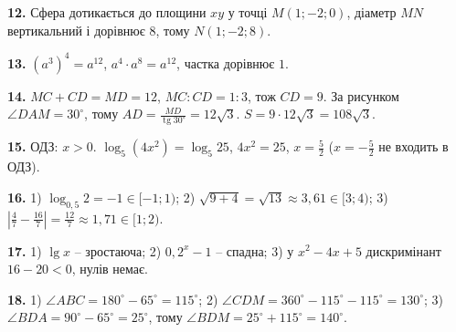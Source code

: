 \documentclass[12pt]{article}
\begin{document}
\par\noindent\textbf{12.} Сфера дотикається до площини $xy$ у точці $M(1;-2;0)$, діаметр $MN$ вертикальний і дорівнює $8$, тому $N(1;-2;8)$.\par\nopagebreak

\par\noindent\textbf{13.} $(a^3)^4=a^{12}$, $a^4\cdot a^8=a^{12}$, частка дорівнює $1$.\par\nopagebreak

\par\noindent\textbf{14.} $MC+CD=MD=12$, $MC:CD=1:3$, тож $CD=9$. За рисунком $\angle DAM=30^\circ$, тому $AD=\frac{MD}{\operatorname{tg}30^\circ}=12\sqrt3$. $S=9\cdot12\sqrt3=108\sqrt3$.\par\nopagebreak

\par\noindent\textbf{15.} ОДЗ: $x>0$. $\log_5(4x^2)=\log_5 25$, $4x^2=25$, $x=\frac52$ ($x=-\frac52$ не входить в ОДЗ).\par\nopagebreak

\par\noindent\textbf{16.} 1) $\log_{0{,}5}2=-1\in[-1;1)$; 2) $\sqrt{9+4}=\sqrt{13}\approx3{,}61\in[3;4)$; 3) $\left|\frac47-\frac{16}{7}\right|=\frac{12}{7}\approx1{,}71\in[1;2)$.\par\nopagebreak

\par\noindent\textbf{17.} 1) $\lg x$ -- зростаюча; 2) $0{,}2^x-1$ -- спадна; 3) у $x^2-4x+5$ дискримінант $16-20<0$, нулів немає.\par\nopagebreak

\par\noindent\textbf{18.} 1) $\angle ABC=180^\circ-65^\circ=115^\circ$; 2) $\angle CDM=360^\circ-115^\circ-115^\circ=130^\circ$; 3) $\angle BDA=90^\circ-65^\circ=25^\circ$, тому $\angle BDM=25^\circ+115^\circ=140^\circ$.\par\nopagebreak
\end{document}

